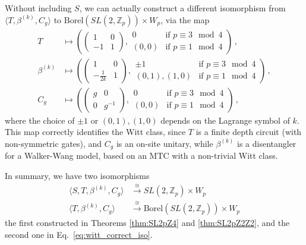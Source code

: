 \documentclass[aps,twocolumn,prx,floatfix,preprintnumbers, nofootinbib,10pt]{revtex4-2}
\numberwithin{equation}{section}
\theoremstyle{definition}
\theoremstyle{remark}
\theoremstyle{claim}
\newcommand{\Z}{{\mathbb Z}}
\newcommand{\paren}[1]{\left( #1 \right)}
\begin{document}
Without including $S$, we can actually construct a different isomorphism from $\langle T, \beta^{(k)}, C_g \rangle$ to $\text{Borel}(SL(2, \Z_p)) \times W_p$, via the map
\begin{align}\label{eq:witt_correct_iso}
 T &\longmapsto \paren{\begin{pmatrix} 1 & 0 \\ -1 & 1 \end{pmatrix}, \begin{matrix} 0 & \text{if } p \equiv 3 \mod 4 \\ (0, 0) & \text{if } p \equiv 1 \mod 4 \end{matrix}} \,, \nonumber \\
 \beta^{(k)} &\longmapsto \paren{\begin{pmatrix} 1 & 0 \\ -\frac{1}{2k} & 1 \end{pmatrix}, \begin{matrix} \pm 1 & \text{if } p \equiv 3 \mod 4 \\ (0, 1), (1, 0) & \text{if } p \equiv 1 \mod 4 \end{matrix}} \,, \nonumber \\
 C_g &\longmapsto \paren{\begin{pmatrix} g & 0 \\ 0 & g^{-1} \end{pmatrix}, \begin{matrix} 0 & \text{if } p \equiv 3 \mod 4 \\ (0, 0) & \text{if } p \equiv 1 \mod 4 \end{matrix}} \,,
\end{align}
where the choice of $\pm 1$ or $(0, 1), (1, 0)$ depends on the Lagrange symbol of $k$. This map correctly identifies the Witt class, since $T$ is a finite depth circuit (with non-symmetric gates), and $C_g$ is an on-site unitary, while $\beta^{(k)}$ is a disentangler for a Walker-Wang model, based on an MTC with a non-trivial Witt class.

In summary, we have two isomorphisms
\begin{align}
 \langle S, T, \beta^{(k)}, C_g \rangle &\xrightarrow{\cong} SL(2, \Z_p) \times W_p \label{eq:STCiso} \\
 \langle T, \beta^{(k)}, C_g \rangle &\xrightarrow{\cong} \text{Borel}\paren{SL(2, \Z_p)} \times W_p \label{eq:TCbetaiso}
\end{align}
the first constructed in Theorems \ref{thm:SL2pZ4} and \ref{thm:SL2pZ2Z2}, and the second one in Eq.~\eqref{eq:witt_correct_iso}.
\end{document}
